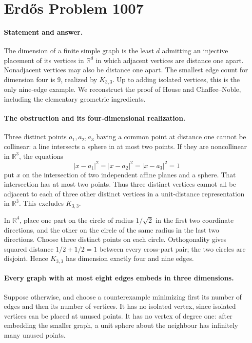 \section*{Erd\H{o}s Problem 1007}

\paragraph{Statement and answer.}
The dimension of a finite simple graph is the least \(d\) admitting an injective placement of its vertices in \(\mathbb R^d\) in which adjacent vertices are distance one apart. Nonadjacent vertices may also be distance one apart. The smallest edge count for dimension four is \(\boxed{9}\), realized by \(K_{3,3}\). Up to adding isolated vertices, this is the only nine-edge example. We reconstruct the proof of House and Chaffee--Noble, including the elementary geometric ingredients.

\paragraph{The obstruction and its four-dimensional realization.}
Three distinct points \(a_1,a_2,a_3\) having a common point at distance one cannot be collinear: a line intersects a sphere in at most two points. If they are noncollinear in \(\mathbb R^3\), the equations
\[
 |x-a_1|^2=|x-a_2|^2=|x-a_3|^2=1
\]
put \(x\) on the intersection of two independent affine planes and a sphere. That intersection has at most two points. Thus three distinct vertices cannot all be adjacent to each of three other distinct vertices in a unit-distance representation in \(\mathbb R^3\). This excludes \(K_{3,3}\).

In \(\mathbb R^4\), place one part on the circle of radius \(1/\sqrt2\) in the first two coordinate directions, and the other on the circle of the same radius in the last two directions. Choose three distinct points on each circle. Orthogonality gives squared distance \(1/2+1/2=1\) between every cross-part pair; the two circles are disjoint. Hence \(K_{3,3}\) has dimension exactly four and nine edges.

\paragraph{Every graph with at most eight edges embeds in three dimensions.}
Suppose otherwise, and choose a counterexample minimizing first its number of edges and then its number of vertices. It has no isolated vertex, since isolated vertices can be placed at unused points. It has no vertex of degree one: after embedding the smaller graph, a unit sphere about the neighbour has infinitely many unused points.

